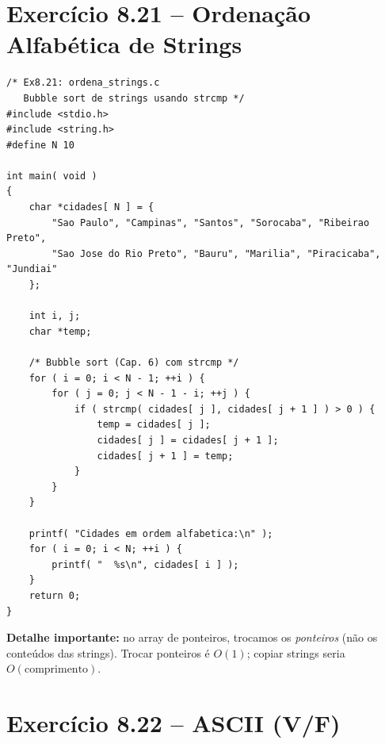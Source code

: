 \documentclass[12pt,a4paper]{article}
\begin{document}
\section{Exercício 8.21 -- Ordenação Alfabética de Strings}

\begin{respostabox}
\begin{lstlisting}
/* Ex8.21: ordena_strings.c
   Bubble sort de strings usando strcmp */
#include <stdio.h>
#include <string.h>
#define N 10

int main( void )
{
    char *cidades[ N ] = {
        "Sao Paulo", "Campinas", "Santos", "Sorocaba", "Ribeirao Preto",
        "Sao Jose do Rio Preto", "Bauru", "Marilia", "Piracicaba", "Jundiai"
    };

    int i, j;
    char *temp;

    /* Bubble sort (Cap. 6) com strcmp */
    for ( i = 0; i < N - 1; ++i ) {
        for ( j = 0; j < N - 1 - i; ++j ) {
            if ( strcmp( cidades[ j ], cidades[ j + 1 ] ) > 0 ) {
                temp = cidades[ j ];
                cidades[ j ] = cidades[ j + 1 ];
                cidades[ j + 1 ] = temp;
            }
        }
    }

    printf( "Cidades em ordem alfabetica:\n" );
    for ( i = 0; i < N; ++i ) {
        printf( "  %s\n", cidades[ i ] );
    }
    return 0;
}
\end{lstlisting}

\textbf{Detalhe importante:} no array de ponteiros, trocamos os \textit{ponteiros}
(não os conteúdos das strings). Trocar ponteiros é $O(1)$; copiar strings seria
$O(\text{comprimento})$.
\end{respostabox}

\newpage

\section{Exercício 8.22 -- ASCII (V/F)}
\end{document}
